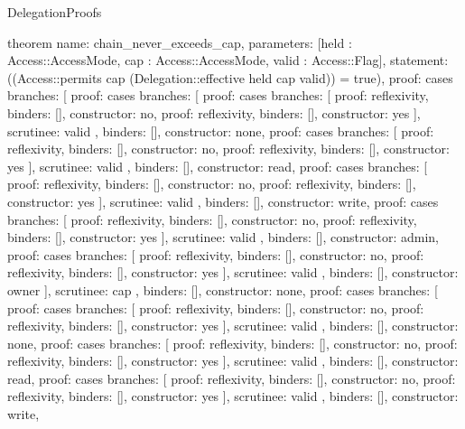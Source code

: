 \begin{lexlean}{DelegationProofs}
\begin{semanticmodule}
theorem{
  name: chain_never_exceeds_cap,
  parameters: [held : Access::AccessMode, cap : Access::AccessMode, valid : Access::Flag],
  statement: ((Access::permits cap (Delegation::effective held cap valid)) = true),
  proof: cases{
    branches: [
      {proof: cases{
        branches: [
          {proof: cases{
            branches: [
              {proof: reflexivity{}, binders: [], constructor: no},
              {proof: reflexivity{}, binders: [], constructor: yes}
            ],
            scrutinee: valid
          }, binders: [], constructor: none},
          {proof: cases{
            branches: [
              {proof: reflexivity{}, binders: [], constructor: no},
              {proof: reflexivity{}, binders: [], constructor: yes}
            ],
            scrutinee: valid
          }, binders: [], constructor: read},
          {proof: cases{
            branches: [
              {proof: reflexivity{}, binders: [], constructor: no},
              {proof: reflexivity{}, binders: [], constructor: yes}
            ],
            scrutinee: valid
          }, binders: [], constructor: write},
          {proof: cases{
            branches: [
              {proof: reflexivity{}, binders: [], constructor: no},
              {proof: reflexivity{}, binders: [], constructor: yes}
            ],
            scrutinee: valid
          }, binders: [], constructor: admin},
          {proof: cases{
            branches: [
              {proof: reflexivity{}, binders: [], constructor: no},
              {proof: reflexivity{}, binders: [], constructor: yes}
            ],
            scrutinee: valid
          }, binders: [], constructor: owner}
        ],
        scrutinee: cap
      }, binders: [], constructor: none},
      {proof: cases{
        branches: [
          {proof: cases{
            branches: [
              {proof: reflexivity{}, binders: [], constructor: no},
              {proof: reflexivity{}, binders: [], constructor: yes}
            ],
            scrutinee: valid
          }, binders: [], constructor: none},
          {proof: cases{
            branches: [
              {proof: reflexivity{}, binders: [], constructor: no},
              {proof: reflexivity{}, binders: [], constructor: yes}
            ],
            scrutinee: valid
          }, binders: [], constructor: read},
          {proof: cases{
            branches: [
              {proof: reflexivity{}, binders: [], constructor: no},
              {proof: reflexivity{}, binders: [], constructor: yes}
            ],
            scrutinee: valid
          }, binders: [], constructor: write},
}}}}
\end{semanticmodule}
\end{lexlean}

